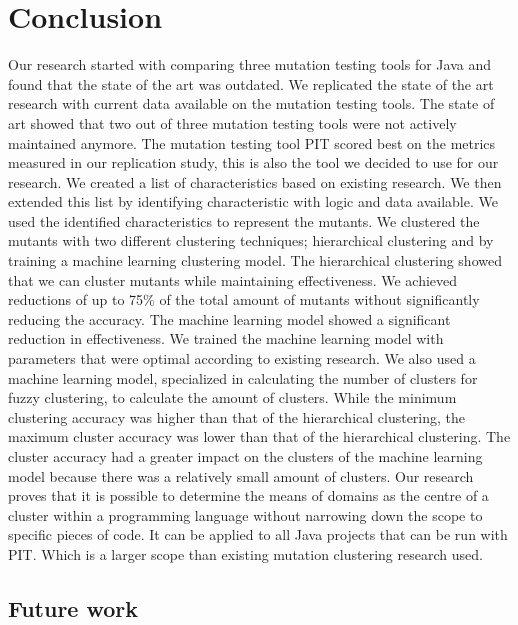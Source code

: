 \documentclass[../main]{subfiles}
\begin{document}
\chapter{Conclusion}
\label{ch:conclusion}
Our research started with comparing three mutation testing tools for Java and found that the state of the art was outdated.
We replicated the state of the art research with current data available on the mutation testing tools.
The state of art showed that two out of three mutation testing tools were not actively maintained anymore.
The mutation testing tool PIT scored best on the metrics measured in our replication study, this is also the tool we decided to use for our research.
\newline
We created a list of characteristics based on existing research. 
We then extended this list by identifying characteristic with logic and data available.
We used the identified characteristics to represent the mutants.
\newline
We clustered the mutants with two different clustering techniques; hierarchical clustering and by training a machine learning clustering model.
The hierarchical clustering showed that we can cluster mutants while maintaining effectiveness.
We achieved reductions of up to 75\% of the total amount of mutants without significantly reducing the accuracy.
\newline
The machine learning model showed a significant reduction in effectiveness.
We trained the machine learning model with parameters that were optimal according to existing research. 
We also used a machine learning model, specialized in calculating the number of clusters for fuzzy clustering, to calculate the amount of clusters.
While the minimum clustering accuracy was higher than that of the hierarchical clustering, the maximum cluster accuracy was lower than that of the hierarchical clustering.
The cluster accuracy had a greater impact on the clusters of the machine learning model because there was a relatively small amount of clusters.
Our research proves that it is possible to determine the means of domains as the centre of a cluster within a programming language without narrowing down the scope to specific pieces of code.
It can be applied to all Java projects that can be run with PIT. 
Which is a larger scope than existing mutation clustering research used.

\section{Future work}
\label{sec:future_work}
\end{document}
